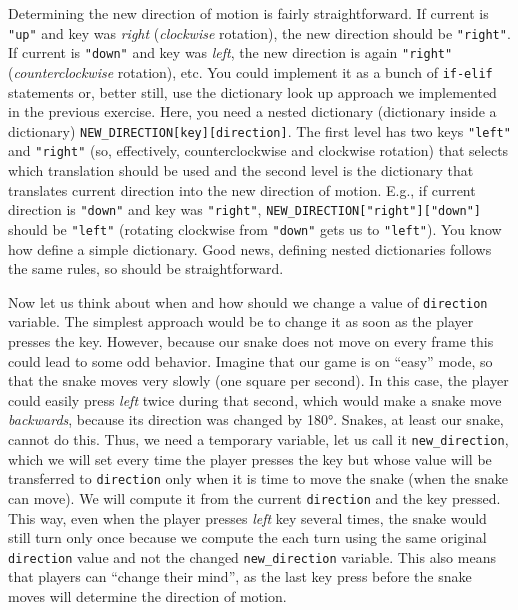 \documentclass[
]{book}
\begin{document}
Determining the new direction of motion is fairly straightforward. If current is \texttt{"up"} and key was \emph{right} (\emph{clockwise} rotation), the new direction should be \texttt{"right"}. If current is \texttt{"down"} and key was \emph{left}, the new direction is again \texttt{"right"} (\emph{counterclockwise} rotation), etc. You could implement it as a bunch of \texttt{if-elif} statements or, better still, use the dictionary look up approach we implemented in the previous exercise. Here, you need a nested dictionary (dictionary inside a dictionary) \texttt{NEW\_DIRECTION{[}key{]}{[}direction{]}}. The first level has two keys \texttt{"left"} and \texttt{"right"} (so, effectively, counterclockwise and clockwise rotation) that selects which translation should be used and the second level is the dictionary that translates current direction into the new direction of motion. E.g., if current direction is \texttt{"down"} and key was \texttt{"right"}, \texttt{NEW\_DIRECTION{[}"right"{]}{[}"down"{]}} should be \texttt{"left"} (rotating clockwise from \texttt{"down"} gets us to \texttt{"left"}). You know how define a simple dictionary. Good news, defining nested dictionaries follows the same rules, so should be straightforward.

Now let us think about when and how should we change a value of \texttt{direction} variable. The simplest approach would be to change it as soon as the player presses the key. However, because our snake does not move on every frame this could lead to some odd behavior. Imagine that our game is on ``easy'' mode, so that the snake moves very slowly (one square per second). In this case, the player could easily press \emph{left} twice during that second, which would make a snake move \emph{backwards}, because its direction was changed by 180°. Snakes, at least our snake, cannot do this. Thus, we need a temporary variable, let us call it \texttt{new\_direction}, which we will set every time the player presses the key but whose value will be transferred to \texttt{direction} only when it is time to move the snake (when the snake can move). We will compute it from the current \texttt{direction} and the key pressed. This way, even when the player presses \emph{left} key several times, the snake would still turn only once because we compute the each turn using the same original \texttt{direction} value and not the changed \texttt{new\_direction} variable. This also means that players can ``change their mind'', as the last key press before the snake moves will determine the direction of motion.
\end{document}
